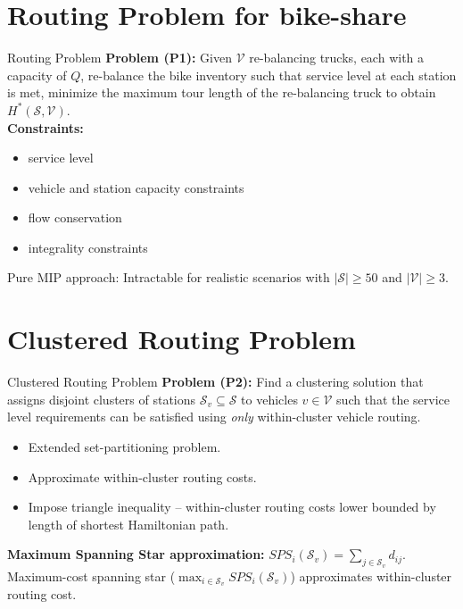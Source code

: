     \section{Routing Problem for bike-share}
    \begin{frame}{Routing Problem}
    \textbf{Problem (P1):} Given $\mathcal{V}$ re-balancing trucks, each with a capacity of $Q$, re-balance the bike inventory such that service level at each station is met, minimize the maximum tour length of the re-balancing truck to obtain $H^*(\mathcal{S}, \mathcal{V})$. \\
    \vspace{0.2in}
    \pause
    \textbf{Constraints:}
    \begin{itemize}
        \item service level
        \item vehicle and station capacity constraints
        \item flow conservation
        \pause
        \item<alert@3>integrality constraints
    \end{itemize}
    \pause
    \alert{Pure MIP approach: Intractable for realistic scenarios with $|\mathcal{S}| \geq 50$ and $|\mathcal{V}| \geq 3$.}
    \end{frame}

    \section{Clustered Routing Problem}
    \begin{frame}{Clustered Routing Problem}
    \textbf{Problem (P2):} Find a clustering solution that assigns disjoint clusters of stations $\mathcal{S}_v \subseteq \mathcal{S}$ to vehicles
    $v \in \mathcal{V}$ such that the service level requirements can be satisfied using \textit{only} within-cluster vehicle routing. \\
    \pause
    \begin{itemize}
        \item Extended set-partitioning problem.
        \pause
        \item Approximate within-cluster routing costs.
        \pause
        \item<alert@4>{Impose triangle inequality -- within-cluster routing costs lower bounded by length of shortest Hamiltonian path.}
    \end{itemize}
    \pause
    \textbf{Maximum Spanning Star approximation:} \pause $SPS_i(\mathcal{S}_v) = \sum_{j \in \mathcal{S}_v}d_{ij}$.
    \pause
    Maximum-cost spanning star \bigg($\max_{i \in \mathcal{S}_v}SPS_i(\mathcal{S}_v)$\bigg) approximates within-cluster routing cost.
    \end{frame}

